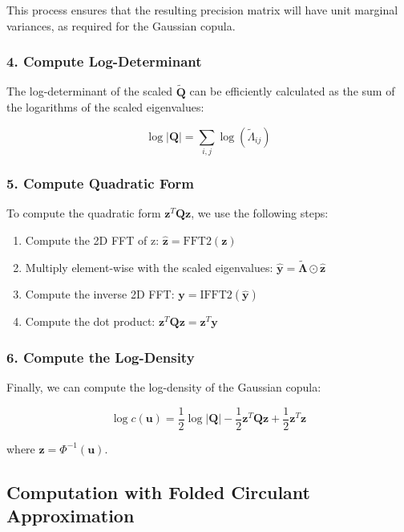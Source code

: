 \documentclass[
  letterpaper,
  DIV=11,
  numbers=noendperiod]{scrartcl}
\providecommand{\tightlist}{%
  \setlength{\itemsep}{0pt}\setlength{\parskip}{0pt}}\usepackage{longtable,booktabs,array}
\begin{document}
This process ensures that the resulting precision matrix will have unit
marginal variances, as required for the Gaussian copula.

\subsubsection{4. Compute
Log-Determinant}\label{compute-log-determinant}

The log-determinant of the scaled \(\mathbf{\widetilde Q}\) can be
efficiently calculated as the sum of the logarithms of the scaled
eigenvalues:

\[
\log|\mathbf{Q}| = \sum_{i,j} \log(\widetilde \Lambda_{ij})
\]

\subsubsection{5. Compute Quadratic Form}\label{compute-quadratic-form}

To compute the quadratic form \(\mathbf{z}^T\mathbf{Q}\mathbf{z}\), we
use the following steps:

\begin{enumerate}
\def\labelenumi{\alph{enumi}.}
\tightlist
\item
  Compute the 2D FFT of z:
  \(\mathbf{\hat{z}} = \text{FFT2}(\mathbf{z})\)
\item
  Multiply element-wise with the scaled eigenvalues:
  \(\mathbf{\hat{y}} = \boldsymbol{\widetilde \Lambda} \odot \mathbf{\hat{z}}\)
\item
  Compute the inverse 2D FFT:
  \(\mathbf{y} = \text{IFFT2}(\mathbf{\hat{y}})\)
\item
  Compute the dot product:
  \(\mathbf{z}^T\mathbf{Q}\mathbf{z} = \mathbf{z}^T\mathbf{y}\)
\end{enumerate}

\subsubsection{6. Compute the
Log-Density}\label{compute-the-log-density}

Finally, we can compute the log-density of the Gaussian copula:

\[
\log c(\mathbf{u}) = \frac{1}{2}\log|\mathbf{Q}| - \frac{1}{2}\mathbf{z}^T\mathbf{Q}\mathbf{z} + \frac{1}{2}\mathbf{z}^T\mathbf{z}
\]

where \(\mathbf{z} = \Phi^{-1}(\mathbf{u})\).

\subsection{Computation with Folded Circulant
Approximation}\label{computation-with-folded-circulant-approximation}
\end{document}
